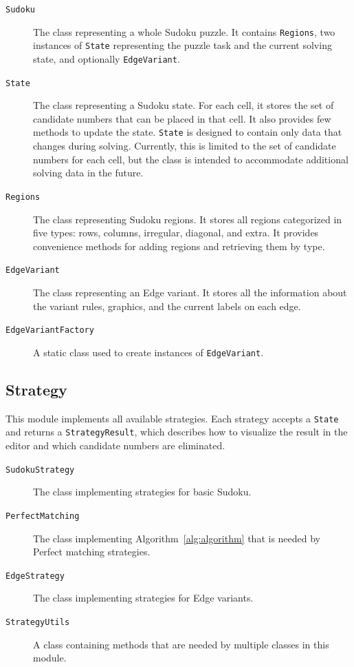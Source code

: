 \begin{description}
    \item[\texttt{Sudoku}]
    The class representing a whole Sudoku puzzle.
    It contains \texttt{Regions},
    two instances of \texttt{State} representing the puzzle task and the current solving state,
    and optionally \texttt{EdgeVariant}.

    \item[\texttt{State}]
    The class representing a Sudoku state.
    For each cell, it stores the set of candidate numbers that can be placed in that cell.
    It also provides few methods to update the state.
    \texttt{State} is designed to contain only data that changes during solving.
    Currently, this is limited to the set of candidate numbers for each cell,
    but the class is intended to accommodate additional solving data in the future.


    \item[\texttt{Regions}]
    The class representing Sudoku regions.
    It stores all regions categorized in five types: rows, columns, irregular, diagonal, and extra.
    It provides convenience methods for adding regions and retrieving them by type.

    \item[\texttt{EdgeVariant}]
    The class representing an Edge variant.
    It stores all the information about the variant rules, graphics, and the current labels on each edge.

    \item[\texttt{EdgeVariantFactory}]
    A static class used to create instances of \texttt{EdgeVariant}.
\end{description}

\subsection*{Strategy}

This module implements all available strategies.
Each strategy accepts a \texttt{State} and returns a \texttt{StrategyResult},
which describes how to visualize the result in the editor and which candidate numbers are eliminated.

\begin{description}
    \item[\texttt{SudokuStrategy}]
    The class implementing strategies for basic Sudoku.

    \item[\texttt{PerfectMatching}]
    The class implementing Algorithm~\ref{alg:algorithm} that is needed by Perfect matching strategies.

    \item[\texttt{EdgeStrategy}]
    The class implementing strategies for Edge variants.

    \item[\texttt{StrategyUtils}]
    A class containing methods that are needed by multiple classes in this module.
\end{description}

